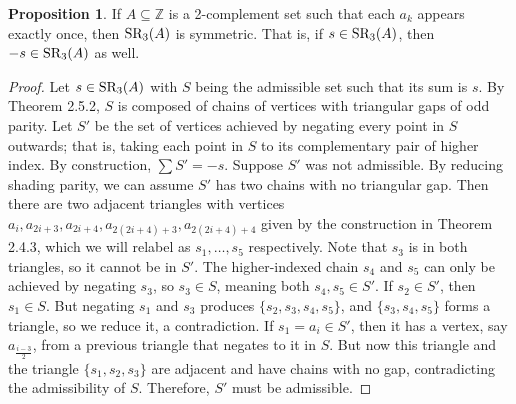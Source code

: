 \documentclass{article}
\theoremstyle{definition}
\newtheorem{prop}[theorem]{Proposition}
\newcommand{\Z}{\mathbb{Z}}
\newcommand{\SR}{\textnormal{SR}}
\begin{document}
\begin{prop}
    If $A \subseteq \Z$ is a 2-complement set such that each $a_k$ appears exactly once, then $\SR_3(A)$ is symmetric. That is, if $s \in \SR_3(A)$, then $-s \in \SR_3(A)$ as well.
\end{prop}
\begin{proof}
    Let $s \in \SR_3(A)$ with $S$ being the admissible set such that its sum is $s$. By Theorem 2.5.2, $S$ is composed of chains of vertices with triangular gaps of odd parity. Let $S'$ be the set of vertices achieved by negating every point in $S$ outwards; that is, taking each point in $S$ to its complementary pair of higher index. By construction, $\sum S' = -s$. Suppose $S'$ was not admissible. By reducing shading parity, we can assume $S'$ has two chains with no triangular gap. Then there are two adjacent triangles with vertices $a_i, a_{2i+3}, a_{2i+4}, a_{2(2i+4) + 3}, a_{2(2i+4)+4}$ given by  the construction in Theorem 2.4.3, which we will relabel as $s_1,\dots,s_5$ respectively. Note that $s_3$ is in both triangles, so it cannot be in $S'$. The higher-indexed chain $s_4$ and $s_5$ can only be achieved by negating $s_3$, so $s_3 \in S$, meaning both $s_4,s_5 \in S'$. If $s_2 \in S'$, then $s_1 \in S$. But negating $s_1$ and $s_3$ produces $\{s_2,s_3,s_4,s_5\}$, and $\{s_3,s_4,s_5\}$ forms a triangle, so we reduce it, a contradiction. If $s_1 = a_i \in S'$, then it has a vertex, say $a_{\frac{i-3}{2}}$, from a previous triangle that negates to it in $S$. But now this triangle and the triangle $\{s_1,s_2,s_3\}$ are adjacent and have chains with no gap, contradicting the admissibility of $S$. Therefore, $S'$ must be admissible.
\end{proof}
\end{document}

